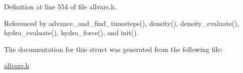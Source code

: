 Definition at line 554 of file allvars.h.



Referenced by advance\_\-and\_\-find\_\-timesteps(), density(), density\_\-evaluate(), hydro\_\-evaluate(), hydro\_\-force(), and init().



The documentation for this struct was generated from the following file:\begin{DoxyCompactItemize}
\item 
\hyperlink{allvars_8h}{allvars.h}\end{DoxyCompactItemize}

